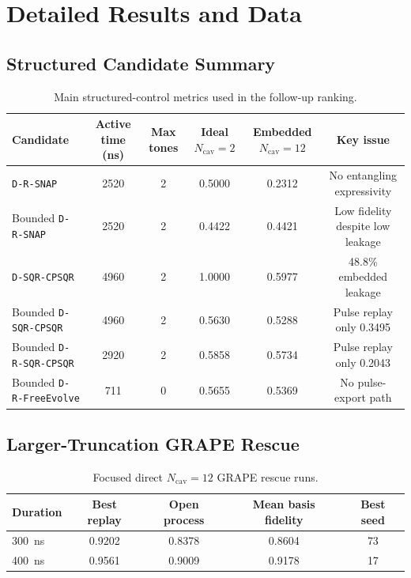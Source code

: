 \documentclass[aps,pra,twocolumn,reprint,amsmath,amssymb]{revtex4-2}
\begin{document}



\appendix

\section{Detailed Results and Data}
\subsection{Structured Candidate Summary}
\begin{table}[t]
\centering
\caption{Main structured-control metrics used in the follow-up ranking.}
\begin{tabular}{@{}lccccc@{}}
\toprule
Candidate & Active time (ns) & Max tones & Ideal $N_{\mathrm{cav}}=2$ & Embedded $N_{\mathrm{cav}}=12$ & Key issue \\
\midrule
\texttt{D-R-SNAP} & 2520 & 2 & 0.5000 & 0.2312 & No entangling expressivity \\
Bounded \texttt{D-R-SNAP} & 2520 & 2 & 0.4422 & 0.4421 & Low fidelity despite low leakage \\
\texttt{D-SQR-CPSQR} & 4960 & 2 & 1.0000 & 0.5977 & 48.8\% embedded leakage \\
Bounded \texttt{D-SQR-CPSQR} & 4960 & 2 & 0.5630 & 0.5288 & Pulse replay only 0.3495 \\
Bounded \texttt{D-R-SQR-CPSQR} & 2920 & 2 & 0.5858 & 0.5734 & Pulse replay only 0.2043 \\
Bounded \texttt{D-R-FreeEvolve} & 711 & 0 & 0.5655 & 0.5369 & No pulse-export path \\
\bottomrule
\end{tabular}
\end{table}

\subsection{Larger-Truncation GRAPE Rescue}
\begin{table}[t]
\centering
\caption{Focused direct $N_{\mathrm{cav}}=12$ GRAPE rescue runs.}
\begin{tabular}{@{}lcccc@{}}
\toprule
Duration & Best replay & Open process & Mean basis fidelity & Best seed \\
\midrule
\SI{300}{ns} & 0.9202 & 0.8378 & 0.8604 & 73 \\
\SI{400}{ns} & 0.9561 & 0.9009 & 0.9178 & 17 \\
\bottomrule
\end{tabular}
\end{table}
\end{document}
